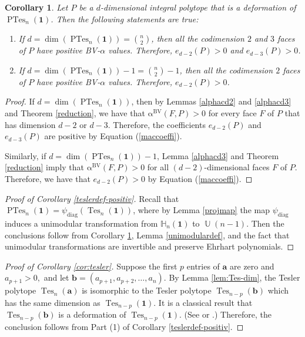 \documentclass[12pt]{amsart}
\numberwithin{equation}{section}
\newtheorem{cor}[thm]{Corollary}
\theoremstyle{definition}
\def\tes{\operatorname{Tes}}
\def\ptes{\operatorname{PTes}}
\def\diag{\operatorname{diag}}
\def\1{{\boldsymbol{1}}}
\def\ba{{\boldsymbol{a}}}
\def\bb{{\boldsymbol{b}}}
\def\bvalpha{\operatorname{\alpha^{BV}}}
\def\U{\operatorname{\mathbb{U}}}
\def\H{\mathbb{H}}
\begin{document}
\begin{cor} \label{maincor}
Let $P$ be a $d$-dimensional integral polytope that is a deformation of $\ptes_{n}(\boldsymbol{1})$. Then the following statements are true:
\begin{enumerate}[label={\rm (\arabic*)}]
  \item If $d=\dim(\ptes_{n}(\boldsymbol{1}))=\binom{n}{2}$, then all the codimension $2$ and $3$ faces of $P$ have positive BV-$\alpha$ values. Therefore, $e_{d-2}(P)>0$ and $e_{d-3}(P)>0$.
  \item If $d=\dim(\ptes_{n}(\boldsymbol{1}))-1=\binom{n}{2}-1$, then all the codimension $2$ faces of $P$ have positive BV-$\alpha$ values. Therefore, $e_{d-2}(P)>0$.
\end{enumerate}
\end{cor}


\begin{proof}If $d=\dim(\ptes_{n}(\boldsymbol{1}))$, then by Lemmas \ref{alphacd2} and \ref{alphacd3} and Theorem \ref{reduction}, we have that $\bvalpha(F,P)>0$ for every face $F$ of $P$ that has dimension $d-2$ or $d-3$. Therefore, the coefficients $e_{d-2}(P)$ and $e_{d-3}(P)$ are positive by Equation (\ref{maccoeffi}). 
	
	Similarly, if $d=\dim(\ptes_{n}(\boldsymbol{1}))-1$, Lemma \ref{alphacd3} and Theorem \ref{reduction} imply that $\bvalpha(F,P)>0$ for all $(d-2)$-dimensional faces $F$ of $P$. Therefore, we have that $e_{d-2}(P)>0$ by Equation (\ref{maccoeffi}).
\end{proof}



\begin{proof}[Proof of Corollary \ref{teslerdef-positiv}]
	Recall that $\ptes_{n}(\boldsymbol{1}) = \psi_{\diag}\left( \tes_n(\boldsymbol{1})  \right)$, where by Lemma \ref{projmap} the map $\psi_{\diag}$ induces a unimodular transformation from $\H_n(\boldsymbol{1})$ to $\U(n-1).$ Then the conclusions follow from Corollary \ref{maincor}, Lemma \ref{unimodulardef}, and the fact that unimodular transformations are invertible and preserve Ehrhart polynomials.
\end{proof}

\begin{proof}[Proof of Corollary \ref{cor:tesler}] Suppose the first $p$ entries of $\ba$ are zero and $a_{p+1} > 0,$ and let $\bb = (a_{p+1}, a_{p+2}, \dots, a_n)$. By Lemma \ref{lem:Tes-dim}, the Tesler polytope $\tes_n(\ba)$ is isomorphic to the Tesler polytope $\tes_{n-p}(\bb)$ which has the same dimension as $\tes_{n-p}(\1).$ It is a classical result that $\tes_{n-p}(\bb)$ is a deformation of $\tes_{n-p}(\1).$ (See \cite{de2010triangulations} or \cite[Section 4]{teslerv1}.)
  Therefore, the conclusion follows from Part (1) of Corollary \ref{teslerdef-positiv}.
\end{proof}











\end{document}
